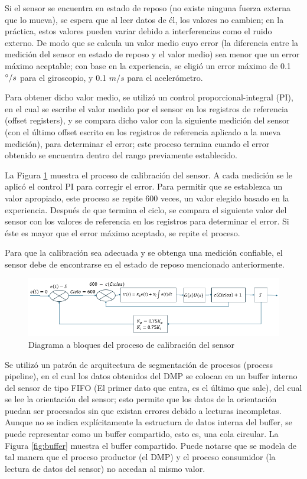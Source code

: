 \documentclass[12pt, twoside]{report}
\begin{document}
Si el sensor se encuentra en estado de reposo (no existe ninguna fuerza externa que lo mueva), se espera que al leer datos de él, los valores no cambien; en la práctica, estos valores pueden variar debido a interferencias como el ruido externo. De modo que se calcula un valor medio cuyo error (la diferencia entre la medición del sensor en estado de reposo y el valor medio) sea menor que un error máximo aceptable; con base en la experiencia, se eligió un error máximo de 0.1 $\degree/s$ para el giroscopio, y 0.1 $m/s$ para el acelerómetro.

Para obtener dicho valor medio, se utilizó un control proporcional-integral (PI), en el cual se escribe el valor medido por el sensor en los registros de referencia (offset registers), y se compara dicho valor con la siguiente medición del sensor (con el último offset escrito en los registros de referencia aplicado a la nueva medición), para determinar el error; este proceso termina cuando el error obtenido se encuentra dentro del rango previamente establecido.

La Figura \ref{fig:calibracion} muestra el proceso de calibración del sensor. A cada medición se le aplicó el control PI para corregir el error. Para permitir que se establezca un valor apropiado, este proceso se repite 600 veces, un valor elegido basado en la experiencia. Después de que termina el ciclo, se compara el siguiente valor del sensor con los valores de referencia en los registros para determinar el error. Si éste es mayor que el error máximo aceptado, se repite el proceso.

Para que la calibración sea adecuada y se obtenga una medición confiable, el sensor debe de encontrarse en el estado de reposo mencionado anteriormente.

\begin{figure}[htb]
	\centering
	\includegraphics[scale=0.9]{calibracion.png}
	\caption{Diagrama a bloques del proceso de calibración del sensor}
	\label{fig:calibracion}
\end{figure}

Se utilizó un patrón de arquitectura de segmentación de procesos (process pipeline), en el cual los datos obtenidos del DMP se colocan en un buffer interno del sensor de tipo FIFO (El primer dato que entra, es el último que sale), del cual se lee la orientación del sensor; esto permite que los datos de la orientación puedan ser procesados sin que existan errores debido a lecturas incompletas. Aunque no se indica explícitamente la estructura de datos interna del buffer, se puede representar como un buffer compartido, esto es, una cola circular. La Figura \ref{fig:buffer} muestra el buffer compartido. Puede notarse que se modela de tal manera que el proceso productor (el DMP) y el proceso consumidor (la lectura de datos del sensor) no accedan al mismo valor.
\end{document}
